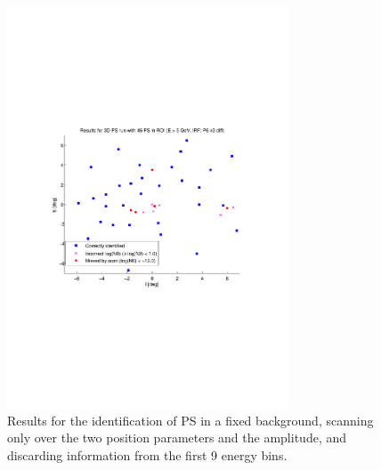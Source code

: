 \documentclass{article}
\begin{document}
\begin{figure}[h]
\centering
\includegraphics[trim = 90 200 100 230, clip = true,width=0.75\textwidth]{figs/3D_50PS_BG_fix.pdf}
\caption{Results for the identification of PS in a fixed background, scanning only over the two position parameters and the amplitude, and discarding information from the first 9 energy bins.\label{3D_PS_results}}
\end{figure}
\end{document}
